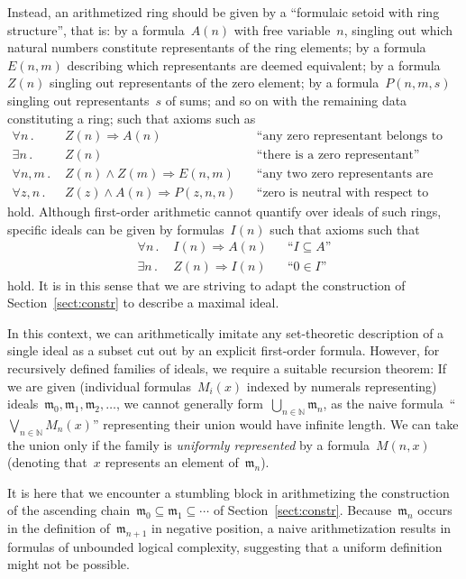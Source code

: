 \documentclass[envcountsect,envcountsame,runningheads]{llncs}
\newcommand{\mmm}{\mathfrak{m}}
\newcommand{\NN}{\mathbb{N}}
\renewcommand{\_}{\mathpunct{.}\,}
\begin{document}
Instead, an arithmetized ring should be given by a ``formulaic setoid with ring
structure'', that is: by a formula~$A(n)$ with free
variable~$n$, singling out which natural numbers constitute
representants of the ring elements; by a formula~$E(n,m)$ describing which
representants are deemed equivalent; by a formula~$Z(n)$ singling out
representants of the zero element; by a formula~$P(n,m,s)$ singling out
representants~$s$ of sums; and so on with the remaining data constituting
a ring; such that axioms such as
\begin{align*}
  \forall n\_ & Z(n) \Rightarrow A(n) && \text{``any zero representant belongs to the ring''} \\
  \exists n\_ & Z(n) && \text{``there is a zero representant''} \\
  \forall n,m\_ & Z(n) \wedge Z(m) \Longrightarrow E(n,m) && \text{``any two zero representants are equivalent''} \\
  \forall z,n\_ & Z(z) \wedge A(n) \Longrightarrow P(z,n,n) && \text{``zero is neutral with respect to addition''}
\end{align*}
hold. Although first-order arithmetic cannot quantify over ideals of such
rings, specific ideals can be given by formulas~$I(n)$ such that axioms such that
\begin{align*}
  \forall n\_ & I(n) \Rightarrow A(n) && \text{``$I \subseteq A$''} \\
  \exists n\_ & Z(n) \Rightarrow I(n) && \text{``$0 \in I$''}
\end{align*}
hold. It is in this sense that we are striving to adapt the construction of
Section~\ref{sect:constr} to describe a maximal ideal.

In this context, we can arithmetically imitate any set-theoretic description of
a single ideal as a subset cut out by an explicit first-order formula. However, for
recursively defined families of ideals, we require a suitable recursion
theorem: If we are given (individual formulas~$M_i(x)$ indexed by numerals
representing) ideals~$\mmm_0,\mmm_1,\mmm_2,\ldots$, we cannot generally
form~$\bigcup_{n\in\NN} \mmm_n$, as the naive formula~``$\bigvee_{n\in\NN} M_n(x)$''
representing their union would have infinite length. We can take the union only
if the family is \emph{uniformly represented} by a formula~$M(n,x)$ (denoting
that~$x$ represents an element of~$\mmm_n$).

It is here that we encounter a stumbling block in arithmetizing the
construction of the ascending chain~$\mmm_0 \subseteq \mmm_1 \subseteq \cdots$
of Section~\ref{sect:constr}. Because~$\mmm_n$ occurs in the
definition of~$\mmm_{n+1}$ in negative position, a naive arithmetization
results in formulas of unbounded logical complexity, suggesting that
a uniform definition might not be possible.
\end{document}
